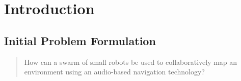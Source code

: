 \chapter{Introduction}\label{Chapter:Introduction}

\section{Initial Problem Formulation}\label{Initial_Problem_Formulation}
\begin{quote}
    How can a swarm of small robots be used to collaboratively map an environment using an audio-based navigation technology?
\end{quote}